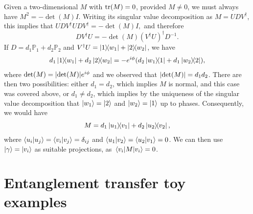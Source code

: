 \documentclass[
	aps, pra,
	superscriptaddress, twocolumn,
	floatfix,
	10pt
]{revtex4-1}
\newcommand{\parTitle}[1]{\noindent{\color{Mahogany}(\emph{#1})}}
\newcommand{\PP}{\mathbb{P}}
\renewcommand{\parTitle}[1]{}
\begin{document}
\parTitle{Proof for general $M$}
Given a two-dimensional $M$ with $\tr(M)=0$, provided $M\neq0$, we must always have $M^2=-\det(M) I$. Writing its singular value decomposition as
$M=UDV^\dagger$, this implies that
$%
	UDV^\dagger UDV^\dagger = -\det(M) I,
$ %
and therefore
\begin{equation}
	DV^\dagger U = -\det(M) (V^\dagger U)^\dagger D^{-1}.
\end{equation}
If $D=d_1\PP_1+d_2\PP_2$ and
$V^\dagger U = \ketbra{1}{w_1} + \ketbra{2}{w_2}$, we have
\begin{equation}
	d_1 \ketbra{1}{w_1} + d_2 \ketbra{2}{w_2} =
	-e^{i\phi}(d_2\ketbra{w_1}{1} + d_1\ketbra{w_2}{2}),
\end{equation}
where $\det(M)=\abs{\det(M)}e^{i\phi}$ and we observed that $\abs{\det(M)}=d_1 d_2$.
There are then two possibilities: either $d_1=d_2$, which implies $M$ is normal, and this case was covered above, or $d_1\neq d_2$, which implies by the uniqueness of the singular value decomposition that $\ket{w_1}=\ket2$ and $\ket{w_2}=\ket1$ up to phases.
Consequently, we would have
\begin{equation}
	M = d_1 \ketbra{u_1}{v_1} + d_2 \ketbra{u_2}{v_2},
\end{equation}
where $\braket{u_i}{u_j}=\braket{v_i}{v_j}=\delta_{ij}$ and $\braket{u_1}{v_2}=\braket{u_2}{v_1}=0$.
We can then use $\ket\gamma=\ket{v_i}$ as suitable projections, as $\mel{v_i}{M}{v_i}=0$.



\section{Entanglement transfer toy examples}
\end{document}
